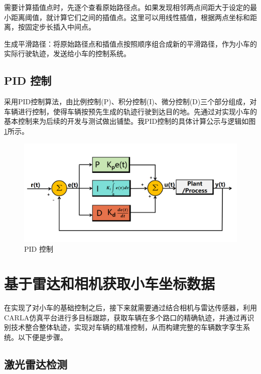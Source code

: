 需要计算插值点时，先逐个查看原始路径点。如果发现相邻两点间距大于设定的最小距离阈值，就计算它们之间的插值点。这里可以用线性插值，根据两点坐标和距离，按固定步长插入中间点。

生成平滑路径：将原始路径点和插值点按照顺序组合成新的平滑路径，作为小车的实际行驶轨迹，发送给小车的控制系统。

\subsection{PID 控制}
采用PID控制算法，由比例控制(P)、积分控制(I)、微分控制(D)三个部分组成，对车辆进行控制，使得车辆按预先生成的轨迹行驶到达目的地。先通过对实现小车的基本控制来为后续的开发与测试做出铺垫。我PID控制的具体计算公示与逻辑如图\ref{fig:p17}所示。


\begin{figure}[htbp] %
	\centering
	\includegraphics[width=1\textwidth]{p17} %
	\caption{PID 控制} %
	\label{fig:p17} %
\end{figure}






\section{基于雷达和相机获取小车坐标数据}
在实现了对小车的基础控制之后，接下来就需要通过结合相机与雷达传感器，利用CARLA仿真平台进行多目标跟踪，获取车辆在多个路口的精确轨迹，并通过再识别技术整合整体轨迹，实现对车辆的精准控制，从而构建完整的车辆数字孪生系统。以下便是步骤。

\subsection{激光雷达检测}

